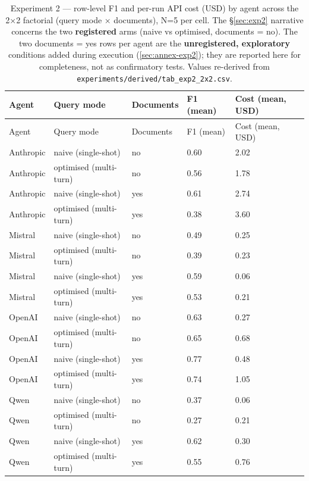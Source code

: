 \documentclass[a4paper,11pt]{article}
\begin{document}
\begin{longtable}[]{@{}lllll@{}}
\caption{\label{tbl:exp2-2x2}Experiment 2 --- row-level F1 and per-run
API cost (USD) by agent across the 2×2 factorial (query mode ×
documents), N=5 per cell. The §\ref{sec:exp2} narrative concerns the two
\textbf{registered} arms (naive vs optimised, documents = no). The two
documents = yes rows per agent are the \textbf{unregistered,
exploratory} conditions added during execution (\ref{sec:annex-exp2});
they are reported here for completeness, not as confirmatory tests.
Values re-derived from
\texttt{experiments/derived/tab\_exp2\_2x2.csv}.}\tabularnewline
\toprule\noalign{}
Agent & Query mode & Documents & F1 (mean) & Cost (mean, USD) \\
\midrule\noalign{}
\endfirsthead
\toprule\noalign{}
Agent & Query mode & Documents & F1 (mean) & Cost (mean, USD) \\
\midrule\noalign{}
\endhead
\bottomrule\noalign{}
\endlastfoot
Anthropic & naive (single-shot) & no & 0.60 & 2.02 \\
Anthropic & optimised (multi-turn) & no & 0.56 & 1.78 \\
Anthropic & naive (single-shot) & yes & 0.61 & 2.74 \\
Anthropic & optimised (multi-turn) & yes & 0.38 & 3.60 \\
Mistral & naive (single-shot) & no & 0.49 & 0.25 \\
Mistral & optimised (multi-turn) & no & 0.39 & 0.23 \\
Mistral & naive (single-shot) & yes & 0.59 & 0.06 \\
Mistral & optimised (multi-turn) & yes & 0.53 & 0.21 \\
OpenAI & naive (single-shot) & no & 0.63 & 0.27 \\
OpenAI & optimised (multi-turn) & no & 0.65 & 0.68 \\
OpenAI & naive (single-shot) & yes & 0.77 & 0.48 \\
OpenAI & optimised (multi-turn) & yes & 0.74 & 1.05 \\
Qwen & naive (single-shot) & no & 0.37 & 0.06 \\
Qwen & optimised (multi-turn) & no & 0.27 & 0.21 \\
Qwen & naive (single-shot) & yes & 0.62 & 0.30 \\
Qwen & optimised (multi-turn) & yes & 0.55 & 0.76 \\
\end{longtable}
\end{document}
